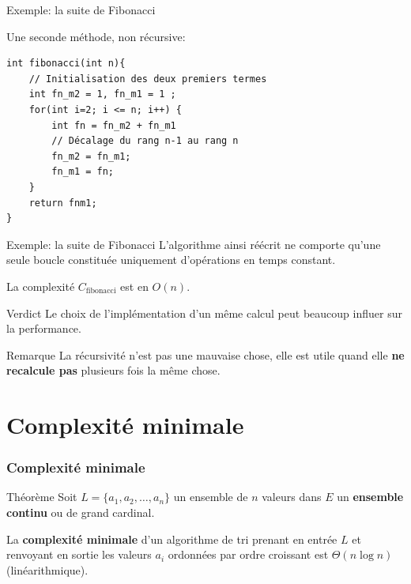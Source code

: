 \begin{frame}[fragile]{Exemple: la suite de Fibonacci}

Une seconde méthode, non récursive:
\begin{verbatim}
int fibonacci(int n){
    // Initialisation des deux premiers termes
    int fn_m2 = 1, fn_m1 = 1 ;
    for(int i=2; i <= n; i++) {
        int fn = fn_m2 + fn_m1
        // Décalage du rang n-1 au rang n
        fn_m2 = fn_m1;
        fn_m1 = fn;
    }
    return fnm1;
}
\end{verbatim}
\end{frame}

\begin{frame}{Exemple: la suite de Fibonacci}
L'algorithme ainsi réécrit ne comporte qu'une seule boucle constituée uniquement d'opérations en temps constant.

La complexité $C_\text{fibonacci}$ est en $O(n)$.

\begin{alertblock}{Verdict}
  Le choix de l'implémentation d'un même calcul peut beaucoup influer sur la performance.
\end{alertblock}
\begin{exampleblock}{Remarque}
  La récursivité n'est pas une mauvaise chose, elle est utile quand elle \textbf{ne recalcule pas} plusieurs fois la même chose.
\end{exampleblock}
\end{frame}

\section{Complexité minimale}

\begin{frame}
\frametitle{Complexité minimale}
\begin{block}{Théorème}
Soit $L = \{ a_1, a_2, \ldots, a_n\}$ un ensemble de $n$ valeurs dans $E$ un \textbf{ensemble continu} ou de grand cardinal.

La \textbf{complexité minimale} d'un algorithme de tri prenant en entrée $L$ et renvoyant en sortie les valeurs $a_i$ ordonnées par ordre croissant est $\Theta(n \log{n})$ (linéarithmique).
\end{block}
\end{frame}

